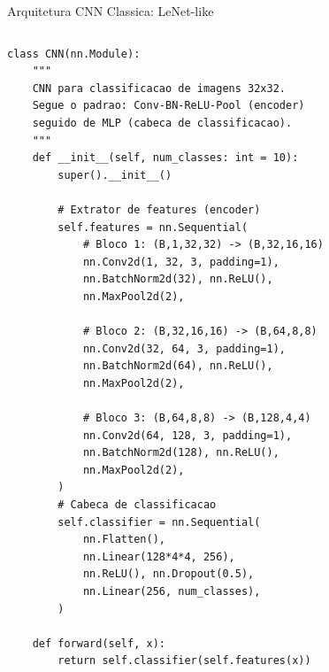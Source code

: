 \documentclass[aspectratio=169, 10pt]{beamer}
\begin{document}
\begin{frame}[fragile]{Arquitetura CNN Classica: LeNet-like}
\begin{columns}
\begin{lstlisting}
class CNN(nn.Module):
    """
    CNN para classificacao de imagens 32x32.
    Segue o padrao: Conv-BN-ReLU-Pool (encoder)
    seguido de MLP (cabeca de classificacao).
    """
    def __init__(self, num_classes: int = 10):
        super().__init__()

        # Extrator de features (encoder)
        self.features = nn.Sequential(
            # Bloco 1: (B,1,32,32) -> (B,32,16,16)
            nn.Conv2d(1, 32, 3, padding=1),
            nn.BatchNorm2d(32), nn.ReLU(),
            nn.MaxPool2d(2),

            # Bloco 2: (B,32,16,16) -> (B,64,8,8)
            nn.Conv2d(32, 64, 3, padding=1),
            nn.BatchNorm2d(64), nn.ReLU(),
            nn.MaxPool2d(2),

            # Bloco 3: (B,64,8,8) -> (B,128,4,4)
            nn.Conv2d(64, 128, 3, padding=1),
            nn.BatchNorm2d(128), nn.ReLU(),
            nn.MaxPool2d(2),
        )
        # Cabeca de classificacao
        self.classifier = nn.Sequential(
            nn.Flatten(),
            nn.Linear(128*4*4, 256),
            nn.ReLU(), nn.Dropout(0.5),
            nn.Linear(256, num_classes),
        )

    def forward(self, x):
        return self.classifier(self.features(x))
\end{lstlisting}


\end{columns}
\end{frame}
\end{document}
